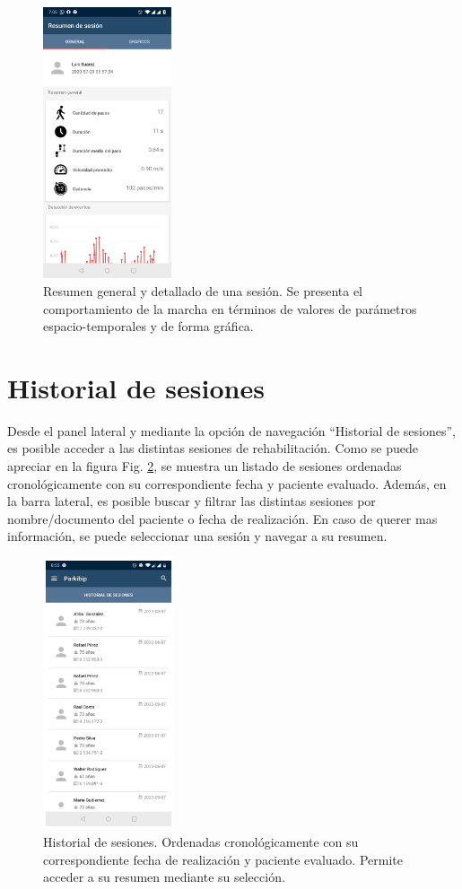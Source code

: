 \begin{figure}[H]
 \centering
 \includegraphics[height=8cm]{TESIS/imagenes/user-manual/manual-resume.JPG}
 \caption{Resumen general y detallado de una sesión. Se presenta el comportamiento de la marcha en términos de valores de parámetros espacio-temporales y de forma gráfica.}
 \label{fig:manual-resume}
\end{figure}

\section{Historial de sesiones}

Desde el panel lateral y mediante la opción de navegación ``Historial de sesiones'', es posible acceder a las distintas sesiones de rehabilitación. Como se puede apreciar en la figura Fig. \ref{fig:manual-history}, se muestra un listado de sesiones ordenadas cronológicamente con su correspondiente fecha y paciente evaluado. Además, en la barra lateral, es posible buscar y filtrar las distintas sesiones por nombre/documento del paciente o fecha de realización. En caso de querer mas información, se puede seleccionar una sesión y navegar a su resumen.

\newpage

\begin{figure}[H]
 \centering
 \includegraphics[height=8cm]{TESIS/imagenes/user-manual/manual-history.PNG}
 \caption{Historial de sesiones. Ordenadas cronológicamente con su correspondiente fecha de realización y paciente evaluado. Permite acceder a su resumen mediante su selección.}
 \label{fig:manual-history}
\end{figure}

